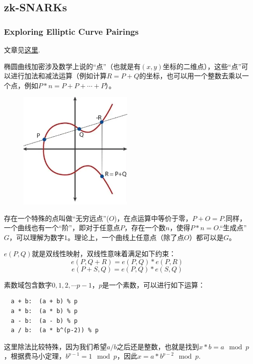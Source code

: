 \documentclass[10pt]{ctexart}
\begin{document}
\subsection{zk-SNARKs}
\subsubsection{Exploring Elliptic Curve Pairings}
文章见\href{https://medium.com/@VitalikButerin/exploring-elliptic-curve-pairings-c73c1864e627}{这里}.

椭圆曲线加密涉及数学上说的“点”（也就是有$(x,y)$坐标的二维点），这些“点”可以进行加法和减法运算（例如计算$R=P+Q$的坐标，也可以用一个整数去乘以一个点，例如$P * n = P + P + \cdots + P$）。
\begin{figure}[H]
    \centering
    \includegraphics[width=0.5\textwidth]{./img/ExploringEllipticCurvePairings/EllipticCurve.png} 
\end{figure}
存在一个特殊的点叫做“无穷远点”($O$)，在点运算中等价于零，$P + O = P$.同样，一个曲线也有一个“阶”，即对于任意点$P$，存在一个数$n$，使得$P * n = O$.“生成点”$G$，可以理解为数字$1$。理论上，一个曲线上任意点（除了点$O$）都可以是$G$。

$e(P,Q)$就是双线性映射，双线性意味着满足如下约束：
$$
e(P,Q+R)=e(P,Q) * e(P,R) 
$$
$$
e(P+S,Q) = e(P,Q) * e(S,Q)
$$

素数域包含数字$0,1,2,\cdots p-1$，$p$是一个素数，可以进行如下运算：
\begin{lstlisting}
  a + b:  (a + b) % p
  a * b:  (a * b) % p
  a - b:  (a - b) % p
  a / b:  (a * b^(p-2)) % p
\end{lstlisting}
这里除法比较特殊，因为我们希望$a/b$之后还是整数，也就是找到$x * b = a \mod p$，根据费马小定理，$b^{p-1} = 1 \mod p$，因此$x = a * b^{p-2} \mod p$.
\end{document}
